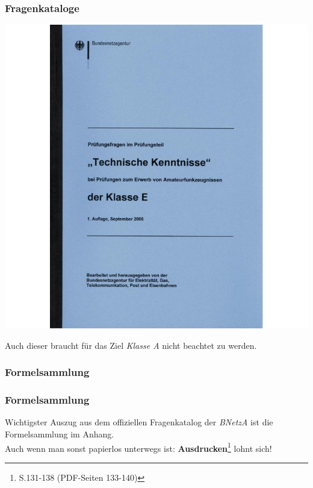 \begin{frame}
    \frametitle{Fragenkataloge}

    \begin{center}
        \includegraphics[height=0.7\textheight]{e00/Fragenkatalog-Klasse-E-Technische-Kenntnisse.jpg}
        \tiny \hyperlink{refs}{\cite{darcv}}
    \end{center}

    Auch dieser braucht für das Ziel \emph{Klasse A} nicht beachtet zu werden.

\end{frame}

\subsubsection{Formelsammlung}

\begin{frame}
    \frametitle{Formelsammlung}

    Wichtigster Auszug aus dem offiziellen Fragenkatalog der \emph{BNetzA} ist
    die Formelsammlung im Anhang. \\[3em]

    Auch wenn man sonst papierlos unterwegs ist:
    \textbf{Ausdrucken}\footnote{S.131-138 (PDF-Seiten 133-140)} lohnt sich!

\end{frame}

